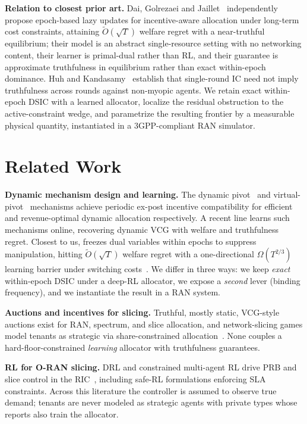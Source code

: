 \documentclass[conference]{IEEEtran}
\theoremstyle{definition}
\theoremstyle{remark}
\newcommand{\Slots}{T}
\newcommand{\Otil}{\tilde{O}}
\begin{document}
\textbf{Relation to closest prior art.} Dai, Golrezaei and Jaillet~\cite{ref:dai} independently propose epoch-based lazy updates for incentive-aware allocation under long-term cost constraints, attaining $\Otil(\sqrt{\Slots})$ welfare regret with a near-truthful equilibrium; their model is an abstract single-resource setting with no networking content, their learner is primal-dual rather than RL, and their guarantee is approximate truthfulness in equilibrium rather than exact within-epoch dominance. Huh and Kandasamy~\cite{ref:huh} establish that single-round IC need not imply truthfulness across rounds against non-myopic agents. We retain exact within-epoch DSIC with a learned allocator, localize the residual obstruction to the active-constraint wedge, and parametrize the resulting frontier by a measurable physical quantity, instantiated in a 3GPP-compliant RAN simulator.

\section{Related Work}\label{sec:related}
\textbf{Dynamic mechanism design and learning.} The dynamic pivot~\cite{ref:bergemann} and virtual-pivot~\cite{ref:kakade} mechanisms achieve periodic ex-post incentive compatibility for efficient and revenue-optimal dynamic allocation respectively. A recent line learns such mechanisms online, recovering dynamic VCG with welfare and truthfulness regret. Closest to us, \cite{ref:dai} freezes dual variables within epochs to suppress manipulation, hitting $\Otil(\sqrt{\Slots})$ welfare regret with a one-directional $\Omega(\Slots^{2/3})$ learning barrier under switching costs~\cite{ref:dekel}. We differ in three ways: we keep \emph{exact} within-epoch DSIC under a deep-RL allocator, we expose a \emph{second} lever (binding frequency), and we instantiate the result in a RAN system.

\textbf{Auctions and incentives for slicing.} Truthful, mostly static, VCG-style auctions exist for RAN, spectrum, and slice allocation, and network-slicing games model tenants as strategic via share-constrained allocation~\cite{ref:slicinggames}. None couples a hard-floor-constrained \emph{learning} allocator with truthfulness guarantees.

\textbf{RL for O-RAN slicing.} DRL and constrained multi-agent RL drive PRB and slice control in the RIC~\cite{ref:coloran,ref:slicing}, including safe-RL formulations enforcing SLA constraints. Across this literature the controller is assumed to observe true demand; tenants are never modeled as strategic agents with private types whose reports also train the allocator.
\end{document}
